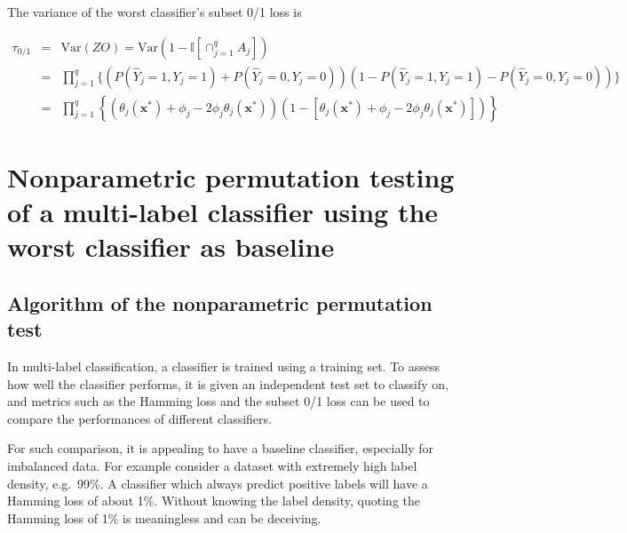 \documentclass[review]{elsarticle}
\begin{document}
The variance of the worst classifier's subset 0/1 loss is

\begin{eqnarray*}
	\tau_{0/1} &=& \mathrm{Var} \left( ZO \right) = \mathrm{Var} \left( 1 - \mathbb{I}\left[ \cap^{q}_{j=1}A_{j} \right] \right) \\
	&=& \prod^{q}_{j=1}{ \{ \left( P(\hat{Y}_{j}=1, Y_{j}=1) + P(\hat{Y}_{j}=0, Y_{j}=0) \right) \left( 1 - P(\hat{Y}_{j}=1, Y_{j}=1) - P(\hat{Y}_{j}=0, Y_{j}=0) \right) \} } \\
	&=& \prod^{q}_{j=1}{ \left \{ \left( \theta_{j}(\mathbf{x}^{*}) + \phi_{j} - 2 \phi_{j}\theta_{j}(\mathbf{x}^{*})  \right) \left( 1 - \left[ \theta_{j}(\mathbf{x}^{*}) + \phi_{j} - 2 \phi_{j}\theta_{j}(\mathbf{x}^{*}) \right] \right) \right \} }
\end{eqnarray*}


\section{Nonparametric permutation testing of a multi-label classifier using the worst classifier as baseline}\label{s:testing}

\subsection{Algorithm of the nonparametric permutation test}\label{ss:algorithm}

In multi-label classification, a classifier is trained using a training set. 
To assess how well the classifier performs, it is given an independent test set to classify on, and metrics such as the Hamming loss and the subset 0/1 loss can be used to compare the performances of different classifiers. 

For such comparison, it is appealing to have a baseline classifier, especially for imbalanced data. For example consider a dataset with extremely high label density, e.g.~99\%. A classifier which always predict positive labels will have a Hamming loss of about 1\%. Without knowing the label density, quoting the Hamming loss of 1\% is meaningless and can be deceiving.
\end{document}
